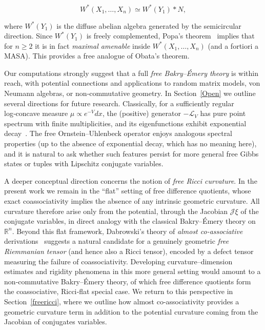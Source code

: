 \documentclass[10pt,a4paper,reqno]{amsart}
\begin{document}
\[
W^\ast(X_1,\ldots,X_n)\simeq W^\ast(Y_1)*N,
\]


where $W^\ast(Y_1)$ is the diffuse abelian algebra generated by the semicircular direction.  Since
$W^\ast(Y_1)$ is freely complemented, Popa’s theorem~\cite{Popa} implies that for $n\ge 2$ it is in
fact \emph{maximal amenable} inside $W^\ast(X_1,\ldots,X_n)$ (and a fortiori a MASA).  This provides a free analogue
of Obata’s theorem.
\par\vspace{0.5em}
Our computations strongly suggest that a full \emph{free Bakry--Émery theory} is within reach, with
potential connections and applications to random matrix models, von Neumann algebras, or non‑commutative geometry.
In Section~\ref{Open} we outline several directions for future research.  Classically, for a
sufficiently regular log‑concave measure $\mu\propto e^{-V}dx$, the (positive) generator $-\mathcal L_V$ has pure point spectrum with
finite multiplicities, and its eigenfunctions exhibit exponential decay~\cite{Davies,ReedSimonIV}.
The free Ornstein--Uhlenbeck operator enjoys analogous spectral properties (up to the absence of
exponential decay, which has no meaning here), and it is natural to ask whether such features
persist for more general free Gibbs states or tuples with Lipschitz conjugate variables.
\par\vspace{0.5em}
A deeper conceptual direction concerns the notion of \emph{free Ricci curvature}.
In the present work we remain in the ``flat'' setting of free difference quotients,
whose exact coassociativity implies the absence of any intrinsic geometric curvature.
All curvature therefore arise only from the potential, through the Jacobian
$\mathscr{J}\xi$ of the conjugate variables, in direct analogy with the classical
Bakry--Émery theory on $\mathbb{R}^n$. Beyond this flat framework, Dabrowski’s theory of \emph{almost co-associative}
derivations~\cite{Dab14v2} suggests a natural candidate for a genuinely geometric
\emph{free Riemmanian tensor} (and hence also a Ricci tensor), encoded by a defect tensor measuring the failure of
coassociativity.  Developing curvature--dimension estimates and rigidity phenomena
in this more general setting would amount to a non‑commutative Bakry--Émery theory,
of which free difference quotients form the coassociative, Ricci‑flat special case. We return to this perspective in
Section~\ref{freericci}, where we outline how almost
co-associativity provides a geometric curvature term in addition to the potential
curvature coming from the Jacobian of conjugates variables.
\end{document}

